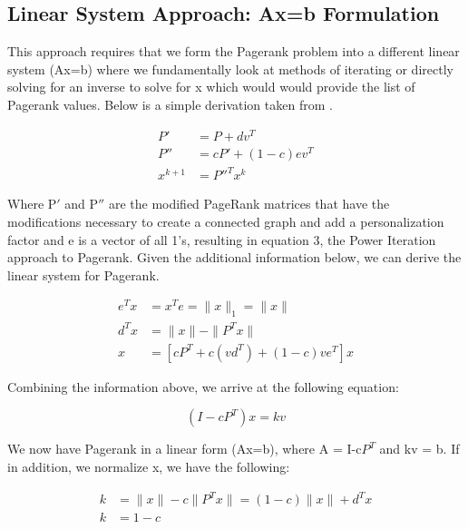 \documentclass[letterpaper,11pt,onecolumn]{article}
\begin{document}
\subsection{Linear System Approach: Ax=b Formulation}
This approach requires that we form the Pagerank problem into a different linear system (Ax=b) where we fundamentally look at methods of iterating or directly solving for an inverse to solve for x which would would provide the list of Pagerank values. Below is a simple derivation taken from \cite{FastParallel}.
\begin{center}
\begin{align}
	P' &= P + dv^{T} \\
	P'' &= cP' + (1-c)ev^{T} \\
	x^{k+1} &= P''^{T}x^{k}
\end{align}

\end{center}
Where P$'$ and P$''$ are the modified PageRank matrices that have the modifications necessary to create a connected graph and add a personalization factor and e is a vector of all 1's, resulting in equation 3, the Power Iteration approach to Pagerank.
\newline
\linebreak
Given the additional information below, we can derive the linear system for Pagerank.


\begin{center}
\begin{align}
  e^{T}x & = x^{T}e = \|x\|_{1} = \|x\| \\
  d^{T}x &= \| x\| - \| P^{T}x\| \\
  x &= [cP^{T} + c(vd^{T}) + (1-c)ve^{T}]x
\end{align}
\end{center}

Combining the information above, we arrive at the following equation:

\begin{center}
\begin{equation}
  (I-cP^{T})x = kv
\end{equation}
\end{center}
We now have Pagerank in a linear form (Ax=b), where A = I-c$P^{T}$ and kv = b. If in addition, we normalize x, we have the following:

\begin{center}
  \begin{align}
	k &= \|x\| - c \|P^{T}x\| = (1-c) \|x\| + d^{T}x \\	
	k &= 1-c 
  \end{align}
\end{center}
\end{document}
